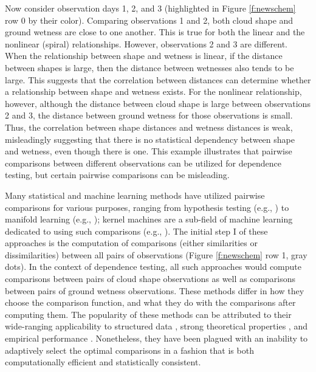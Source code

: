 \documentclass[11pt]{article}
\begin{document}
Now consider observation days 1, 2, and 3 (highlighted in Figure \ref{f:newschem} row 0 by their color).  Comparing observations 1 and 2, both cloud shape and ground wetness are close to one another.  This is true  for both the linear  and the nonlinear (spiral) relationships.  However,  observations 2 and 3 are different.  When the relationship between shape and wetness is linear, if the distance between shapes  is large, then the distance between wetnesses also tends to be large.  This suggests that the correlation between distances can determine whether a relationship between shape and wetness exists.  
% 
For the nonlinear relationship, however, although the distance between cloud shape is large between observations 2 and 3, the distance between ground wetness for those observations is small.  
Thus, the correlation between shape distances and wetness distances is weak, misleadingly suggesting that there is no statistical dependency between shape and wetness, even though there is one.  
This example illustrates that pairwise comparisons between different observations can be utilized for dependence testing, but certain pairwise comparisons can be misleading.

Many statistical and machine learning methods have utilized pairwise comparisons for various purposes, ranging from hypothesis testing (e.g., \cite{David1966,Mantel1967,Friedman1983,Schilling1986,Maa1996,SzekelyRizzo2009,SzekelyRizzo2013b,HellerGorfine2013,Dumcke2014}) 
to manifold learning (e.g., \cite{TorgersonBook, TenenbaumSilvaLangford2000, SaulRoweis2000, BelkinNiyogi2003,DiffusionPNAS, MMS:NoisyDictionaryLearning}); kernel machines are a sub-field of machine learning dedicated to using such comparisons (e.g., \cite{scholkopf2002learning,GrettonEtAl2005,harchaoui2013kernel}).
The initial step I of these approaches is the computation of comparisons (either  similarities or dissimilarities) between all pairs of observations (Figure \ref{f:newschem} row 1, gray dots).  In the context of  dependence testing, all such approaches  would compute comparisons between pairs of cloud shape observations as well as comparisons between pairs of ground wetness observations. These methods differ in how they choose the comparison function, and what they do with the comparisons after computing them. 
The popularity of these methods can be attributed to their wide-ranging applicability to structured data \cite{scholkopf2002learning}, strong theoretical properties \cite{SilvaTenenbaum2002,Allard2012},  and empirical performance \cite{lu2014scale}.
Nonetheless, they have been plagued with an inability to adaptively select the optimal comparisons in a fashion that is both computationally efficient and statistically consistent.  
\end{document}
